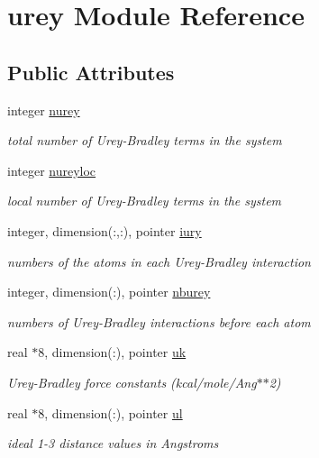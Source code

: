 \hypertarget{classurey}{\section{urey Module Reference}
\label{classurey}
}
\subsection*{Public Attributes}
\begin{DoxyCompactItemize}
\item 
integer \hyperlink{classurey_a69eb177891f8ef35b6291841f723b5da}{nurey}
\begin{DoxyCompactList}\small\item\em total number of Urey-\/\-Bradley terms in the system \end{DoxyCompactList}\item 
integer \hyperlink{classurey_a026499b4e231a038a6e81b20c7a1ef2d}{nureyloc}
\begin{DoxyCompactList}\small\item\em local number of Urey-\/\-Bradley terms in the system \end{DoxyCompactList}\item 
integer, dimension(\-:,\-:), pointer \hyperlink{classurey_ac0be6030887dcc7b4b10c65e237e7bc9}{iury}
\begin{DoxyCompactList}\small\item\em numbers of the atoms in each Urey-\/\-Bradley interaction \end{DoxyCompactList}\item 
integer, dimension(\-:), pointer \hyperlink{classurey_a4f87085046f2d60d39c4fd1ad75184ba}{nburey}
\begin{DoxyCompactList}\small\item\em numbers of Urey-\/\-Bradley interactions before each atom \end{DoxyCompactList}\item 
real $\ast$8, dimension(\-:), pointer \hyperlink{classurey_aebf3f1a2659249aa71a3e9e051dfe5fe}{uk}
\begin{DoxyCompactList}\small\item\em Urey-\/\-Bradley force constants (kcal/mole/\-Ang$\ast$$\ast$2) \end{DoxyCompactList}\item 
real $\ast$8, dimension(\-:), pointer \hyperlink{classurey_a25d40d37004ea0056782407850a7f9e6}{ul}
\begin{DoxyCompactList}\small\item\em ideal 1-\/3 distance values in Angstroms \end{DoxyCompactList}\item 

\end{DoxyCompactItemize}
